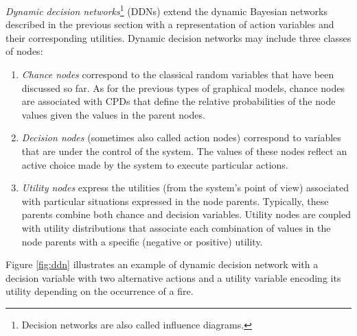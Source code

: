 \textit{Dynamic decision networks}\footnote{Decision networks are also called influence diagrams.} (DDNs) extend the dynamic Bayesian networks described in the previous section with a representation of action variables and their corresponding utilities.  Dynamic decision networks may include three classes of nodes:
\begin{enumerate}
\item \textit{Chance nodes} correspond to the classical random variables that have been discussed so far.  As for the previous types of graphical models,  chance nodes are associated with CPDs that define the relative probabilities of the node values given the values in the parent nodes.
\item \textit{Decision nodes} (sometimes also called action nodes) correspond to variables that are under the control of the system.  The values of these nodes reflect an active choice made by the system to execute particular actions.
\item \textit{Utility nodes} express the utilities (from the system's point of view) associated with particular situations expressed in the node parents.  Typically, these parents combine both chance and decision variables.   Utility nodes are coupled with utility distributions that associate each combination of values in the node parents with a specific (negative or positive) utility. 
\end{enumerate}

Figure \ref{fig:ddn} illustrates an example of dynamic decision network with a decision variable with two alternative actions and  a utility variable encoding its utility depending on the occurrence of a fire. 



